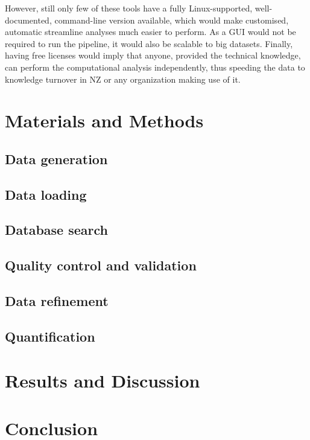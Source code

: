 \documentclass[11pt, a4paper]{report}
\begin{document}
However, still only few of these tools have a fully Linux-supported, well-documented, command-line version available, which would make customised, automatic streamline analyses much easier to perform. As a GUI would not be required to run the pipeline, it would also be scalable to big datasets. Finally, having free licenses would imply that anyone, provided the technical knowledge, can perform the computational analysis independently, thus speeding the data to knowledge turnover in \ac{NZ} or any organization making use of it.


\section{Materials and Methods}

\subsection{Data generation}

\subsection{Data loading}

\subsection{Database search}

\subsection{Quality control and validation}

\subsection{Data refinement}

\subsection{Quantification}


\section{Results and Discussion}




\section{Conclusion}
\end{document}
